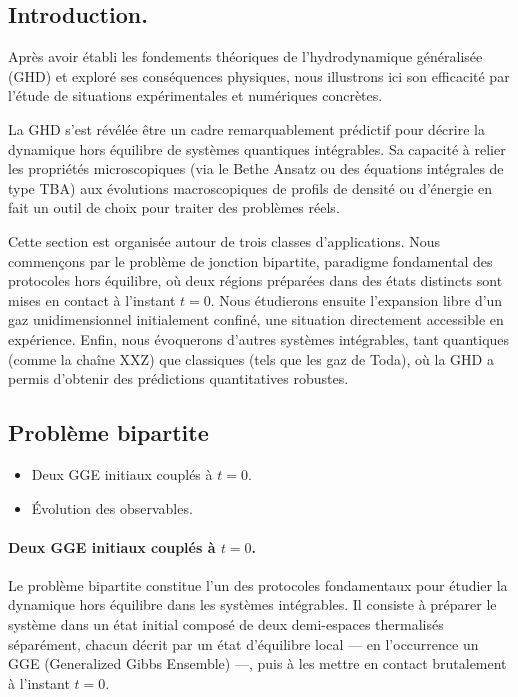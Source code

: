 \subsection*{Introduction.}
Après avoir établi les fondements théoriques de l’hydrodynamique généralisée (GHD) et exploré ses conséquences physiques, nous illustrons ici son efficacité par l’étude de situations expérimentales et numériques concrètes.

La GHD s’est révélée être un cadre remarquablement prédictif pour décrire la dynamique hors équilibre de systèmes quantiques intégrables. Sa capacité à relier les propriétés microscopiques (via le Bethe Ansatz ou des équations intégrales de type TBA) aux évolutions macroscopiques de profils de densité ou d’énergie en fait un outil de choix pour traiter des problèmes réels.

Cette section est organisée autour de trois classes d’applications. Nous commençons par le problème de jonction bipartite, paradigme fondamental des protocoles hors équilibre, où deux régions préparées dans des états distincts sont mises en contact à l’instant $t=0$. Nous étudierons ensuite l’expansion libre d’un gaz unidimensionnel initialement confiné, une situation directement accessible en expérience. Enfin, nous évoquerons d'autres systèmes intégrables, tant quantiques (comme la chaîne XXZ) que classiques (tels que les gaz de Toda), où la GHD a permis d’obtenir des prédictions quantitatives robustes.


\subsection{Problème bipartite}
{\color{blue}
\begin{itemize}
    \item Deux GGE initiaux couplés à $t=0$.
    \item Évolution des observables.
\end{itemize}
}


\paragraph{Deux GGE initiaux couplés à $t=0$.}
Le problème bipartite constitue l’un des protocoles fondamentaux pour étudier la dynamique hors équilibre dans les systèmes intégrables. Il consiste à préparer le système dans un état initial composé de deux demi-espaces thermalisés séparément, chacun décrit par un état d’équilibre local — en l'occurrence un GGE (Generalized Gibbs Ensemble) —, puis à les mettre en contact brutalement à l’instant $t=0$.

